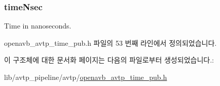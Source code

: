 \subsubsection[{\texorpdfstring{time\+Nsec}{timeNsec}}]{ time\+Nsec}\hypertarget{structavtp__time__t_affd0c73d1b4a5fe0cfff000872016eac}{}\label{structavtp__time__t_affd0c73d1b4a5fe0cfff000872016eac}


Time in nanoseconds. 



openavb\+\_\+avtp\+\_\+time\+\_\+pub.\+h 파일의 53 번째 라인에서 정의되었습니다.



이 구조체에 대한 문서화 페이지는 다음의 파일로부터 생성되었습니다.\+:\begin{DoxyCompactItemize}
\item 
lib/avtp\+\_\+pipeline/avtp/\hyperlink{avtp_2openavb__avtp__time__pub_8h}{openavb\+\_\+avtp\+\_\+time\+\_\+pub.\+h}\end{DoxyCompactItemize}
